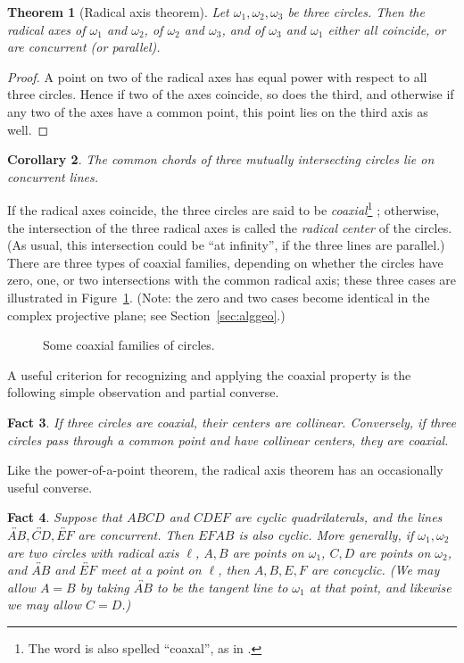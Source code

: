 \documentclass[12pt]{book}
\numberwithin{exc}{section}
\numberwithin{figure}{section}
\newtheorem{theorem}{Theorem}[section]
\newtheorem{fact}[theorem]{Fact}
\newtheorem{corr}[theorem]{Corollary}
\numberwithin{equation}{theorem}
\def\line#1{\overleftrightarrow{#1}}
\begin{document}
\begin{theorem}[Radical axis theorem]
Let $\omega_{1}, \omega_{2}, \omega_{3}$ be three circles. Then the 
radical axes of $\omega_{1}$ and $\omega_{2}$, of $\omega_{2}$ and 
$\omega_{3}$, and of $\omega_{3}$ and $\omega_{1}$ either all 
coincide, or are concurrent (or parallel).
\end{theorem}
\begin{proof}
A point on two of the radical axes has equal power with respect to all 
three circles. Hence if two of the axes coincide, so does the third, 
and otherwise if any two of the axes have a common point, this point 
lies on the third axis as well.
\end{proof}
\begin{corr}
The common chords of three mutually intersecting circles lie on 
concurrent lines.
\end{corr}

If the radical axes coincide, the three circles are said to be 
\emph{coaxial}\footnote{The word is also spelled ``coaxal'', as in
\cite{bib:cg}.} ; 
otherwise, the intersection of the three radical axes 
is called the \emph{radical center} 
of the circles. (As usual, this 
intersection could be ``at infinity'', if the three lines are 
parallel.) There are three 
types of coaxial families, depending on whether the circles have zero, 
one, or two intersections with the common radical axis; these three 
cases are illustrated in Figure~\ref{fig:coaxial}.
(Note: the zero and two cases become identical in the complex
projective plane; see Section~\ref{sec:alggeo}.)
\begin{figure}[ht]
\caption{Some coaxial families of circles.}
\label{fig:coaxial}
\end{figure}
A useful
criterion for recognizing and applying the coaxial property is the
following simple observation and partial converse.
\begin{fact}
If three circles are coaxial, their centers are collinear. Conversely,
if three circles pass through a common point and have collinear
centers, they are coaxial.
\end{fact}

Like the power-of-a-point theorem, the radical axis theorem has an 
occasionally useful converse.
\begin{fact} \label{fact:radaxconv}
Suppose that $ABCD$ and $CDEF$ are cyclic quadrilaterals, and the lines 
$\line{AB}, \line{CD}, \line{EF}$ 
are concurrent. Then $EFAB$ is also cyclic. More generally,
if $\omega_1,\omega_2$ are two circles with radical axis $\ell$,
$A,B$ are points on $\omega_1$, $C,D$ are points on $\omega_2$, and
$\line{AB}$ and $\line{EF}$ 
meet at a point on $\ell$, then $A,B,E,F$ are concyclic.
(We may allow $A=B$ by taking $\line{AB}$ to be the tangent line to $\omega_1$
at that point, and likewise we may allow $C=D$.)
\end{fact}
\end{document}
